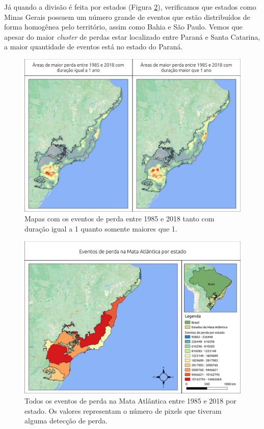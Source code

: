 Já quando a divisão é feita por estados (Figura \ref{fig:estados_loss_masked85_maskedgain}), verificamos que estados como Minas Gerais possuem um número grande de eventos que estão distribuídos de forma homogênea pelo território, assim como Bahia e São Paulo. Vemos que apesar do maior \textit{cluster} de perdas estar localizado entre Paraná e Santa Catarina, a maior quantidade de eventos está no estado do Paraná. 

\begin{figure}[H]
    \centering
    \includegraphics[scale=.5]{images/heatmap_loss_eq1_neq1.pdf}
    \caption{Mapas com os eventos de perda entre 1985 e 2018 tanto com duração igual a 1 quanto somente maiores que 1.}
    \label{fig:heat_loss_eq1_neq1}
\end{figure}

\begin{figure}[H]
    \centering
    \includegraphics[scale=.5]{images/estados_loss_masked85_maskedGain.pdf}
    \caption{Todos os eventos de perda na Mata Atlântica entre 1985 e 2018 por estado. Os valores representam o número de pixels que tiveram alguma detecção de perda.}
    \label{fig:estados_loss_masked85_maskedgain}
\end{figure}

